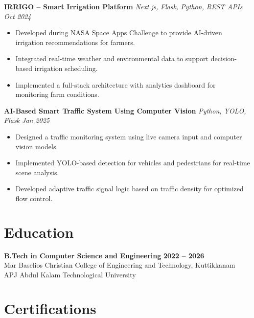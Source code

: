 \documentclass[a4paper,10pt]{article}
\begin{document}
\vspace{4pt}

\textbf{IRRIGO -- Smart Irrigation Platform} \hfill \textit{Next.js, Flask, Python, REST APIs \quad Oct 2024}
\begin{itemize}
\item Developed during NASA Space Apps Challenge to provide AI-driven irrigation recommendations for farmers.
\item Integrated real-time weather and environmental data to support decision-based irrigation scheduling.
\item Implemented a full-stack architecture with analytics dashboard for monitoring farm conditions.
\end{itemize}

\vspace{4pt}

\textbf{AI-Based Smart Traffic System Using Computer Vision} \hfill \textit{Python, YOLO, Flask \quad Jan 2025}
\begin{itemize}
\item Designed a traffic monitoring system using live camera input and computer vision models.
\item Implemented YOLO-based detection for vehicles and pedestrians for real-time scene analysis.
\item Developed adaptive traffic signal logic based on traffic density for optimized flow control.
\end{itemize}

\section*{Education}

\textbf{B.Tech in Computer Science and Engineering} \hfill \textbf{2022 -- 2026}\\
Mar Baselios Christian College of Engineering and Technology, Kuttikkanam \hfill APJ Abdul Kalam Technological University

\section*{Certifications}
\end{document}
